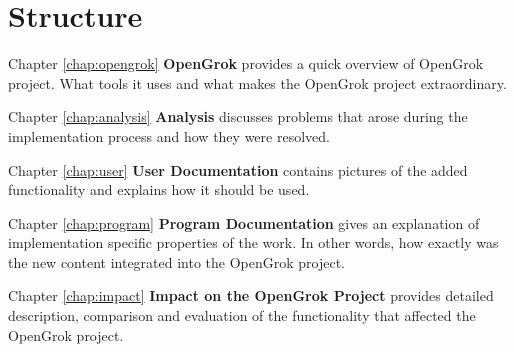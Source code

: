 \section{Structure}

Chapter \ref{chap:opengrok} \textbf{OpenGrok} provides a quick overview of OpenGrok project. What tools it uses and what
makes the OpenGrok project extraordinary.

Chapter \ref{chap:analysis} \textbf{Analysis} discusses problems that arose during the implementation process and how
they were resolved.

Chapter \ref{chap:user} \textbf{User Documentation} contains pictures of the added functionality and explains how it
should be used.

Chapter \ref{chap:program} \textbf{Program Documentation} gives an explanation of implementation specific properties of the work.
In other words, how exactly was the new content integrated into the OpenGrok project.

Chapter \ref{chap:impact} \textbf{Impact on the OpenGrok Project} provides detailed description, comparison and
evaluation of the functionality that affected the OpenGrok project.
